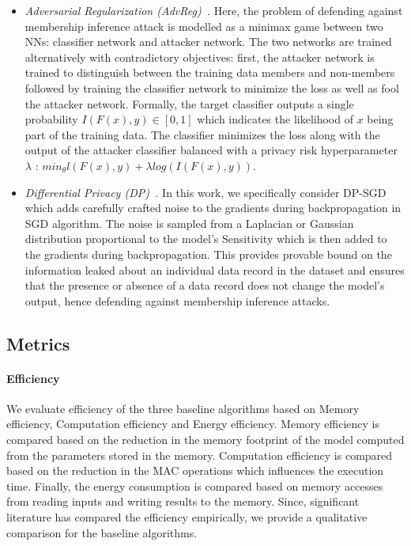 \begin{itemize}[leftmargin=*]
\item {\em Adversarial Regularization (AdvReg)~\cite{DBLP:conf/ccs/NasrSH18}.} Here, the problem of defending against membership inference attack is modelled as a minimax game between two NNs: classifier network and attacker network.
The two networks are trained alternatively with contradictory objectives: first, the attacker network is trained to distinguish between the training data members and non-members followed by training the classifier network to minimize the loss as well as fool the attacker network.
Formally, the target classifier outputs a single probability $I(F(x),y) \in [0,1]$ which indicates the likelihood of $x$ being part of the training data.
The classifier minimizes the loss along with the output of the attacker classifier balanced with a privacy risk hyperparameter $\lambda$ : $min_{\theta} l(F(x),y) + \lambda log(I(F(x),y))$.

\item {\em Differential Privacy (DP)~\cite{Abadi:2016:DLD:2976749.2978318}.} In this work, we specifically consider DP-SGD which adds carefully crafted noise to the gradients during backpropagation in SGD algorithm.
The noise is sampled from a Laplacian or Gaussian distribution proportional to the model's Sensitivity which is then added to the gradients during backpropagation.
This provides provable bound on the information leaked about an individual data record in the dataset and ensures that the presence or absence of a data record does not change the model's output, hence defending against membership inference attacks.
\end{itemize}

\subsection{Metrics}
\label{metrics}

\paragraph{Efficiency} We evaluate efficiency of the three baseline algorithms based on Memory efficiency, Computation efficiency and Energy efficiency. Memory efficiency is compared based on the reduction in the memory footprint of the model computed from the parameters stored in the memory. Computation efficiency is compared based on the reduction in the MAC operations which influences the execution time. Finally, the energy consumption is compared based on memory accesses from reading inputs and writing results to the memory. Since, significant literature has compared the efficiency empirically, we provide a qualitative comparison for the baseline algorithms.

